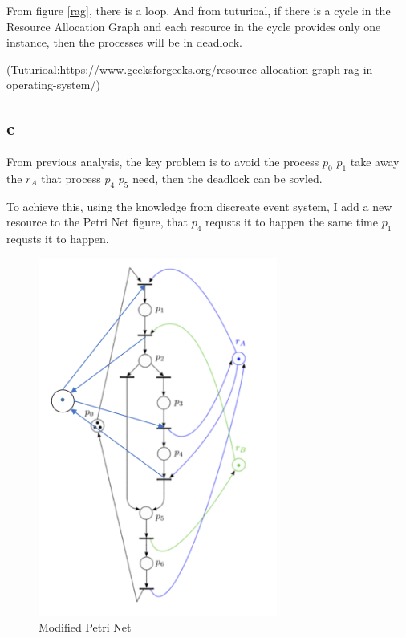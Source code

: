 From figure \ref{rag}, there is a loop. And from tuturioal, if there is a cycle in the Resource Allocation Graph and each resource in the cycle provides only one instance, then the processes will be in deadlock.

(Tuturioal:https://www.geeksforgeeks.org/resource-allocation-graph-rag-in-operating-system/)

\subsection{c}

From previous analysis, the key problem is to avoid the process $ p_0 $ \rightarrow $ p_1 $ take away the $ r_A $ that process $ p_4 $ \rightarrow $ p_5 $ need, then the deadlock can be sovled.

To achieve this, using the knowledge from discreate event system, I add a new resource to the Petri Net figure, that $ p_4 $ requsts it to happen the same time $ p_1 $ requsts it to happen.

\begin{figure}[H]
 \centering
 \includegraphics[width=0.7\textwidth]{images/modify.png}
 \caption{Modified Petri Net}
 \label{md}
\end{figure}

